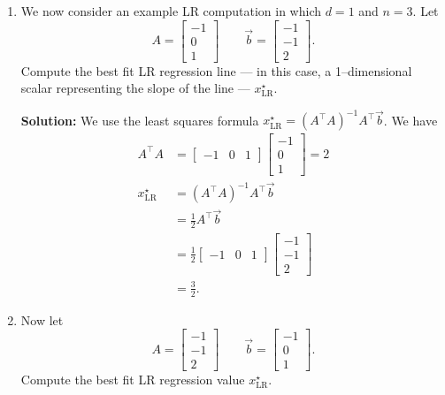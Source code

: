 \documentclass[10pt]{article}
\begin{document}
\begin{enumerate}[label=(\alph*)]
\item We now consider an example LR computation in which $d = 1$ and $n = 3$. Let
\begin{equation}
A = \begin{bmatrix} -1 \\ 0 \\ 1 \end{bmatrix} \qquad \vec{b} = \begin{bmatrix} -1 \\ -1 \\ 2 \end{bmatrix}.
\end{equation}
Compute the best fit LR regression line --- in this case, a 1--dimensional scalar representing the slope of the line --- $x^\star_{\text{LR}}$.

\textbf{Solution:} We use the least squares formula $x^\star_{\text{LR}} = (A^\top A)^{-1} A^\top \vec{b}$. We have
\begin{align}
A^\top A &= \begin{bmatrix} -1 & 0 & 1 \end{bmatrix} \begin{bmatrix} -1 \\ 0 \\ 1 \end{bmatrix} = 2 \\
x^\star_{\text{LR}} &= (A^\top A)^{-1} A^\top \vec{b} \\
&= \frac{1}{2} A^\top \vec{b} \\
&= \frac{1}{2} \begin{bmatrix} -1 & 0 & 1 \end{bmatrix} \begin{bmatrix} -1 \\ -1 \\ 2 \end{bmatrix} \\
&= \frac{3}{2}.
\end{align}

\item Now let
\begin{equation}
A = \begin{bmatrix} -1 \\ -1 \\ 2 \end{bmatrix} \qquad \vec{b} = \begin{bmatrix} -1 \\ 0 \\ 1 \end{bmatrix}.
\end{equation}
Compute the best fit LR regression value $x^\star_{\text{LR}}$.


\end{enumerate}
\end{document}
